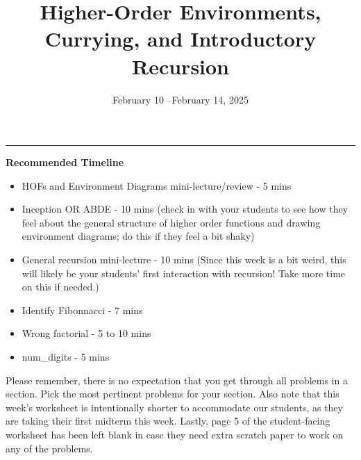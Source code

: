 \documentclass{exam}
\title{Higher-Order Environments, Currying, and Introductory Recursion}
\date{February 10 --February 14, 2025}
\begin{document}
\maketitle
\rule{\textwidth}{0.15em}
\fontsize{12}{15}\selectfont

\begin{meta}
\textbf{Recommended Timeline}
\begin{itemize}
    \item HOFs and Environment Diagrams mini-lecture/review - 5 mins
    \item Inception OR ABDE - 10 mins (check in with your students to see how they feel about the general structure of higher order functions and drawing environment diagrams; do this if they feel a bit shaky)
    \item General recursion mini-lecture - 10 mins (Since this week is a bit weird, this will likely be your students' first interaction with recursion! Take more time on this if needed.)
    \item Identify Fibonnacci - 7 mins
    \item Wrong factorial - 5 to 10 mins
    \item num\_digits - 5 mins
\end{itemize}
Please remember, there is no expectation that you get through all problems in a section. Pick the most pertinent problems for your section. 
Also note that  this week's worksheet is intentionally shorter to accommodate our students, as they are taking their first midterm this week.
Lastly,  page 5 of the student-facing worksheet has been left blank in case they need extra scratch paper to work on any of the problems.
\end{meta}
\end{document}
